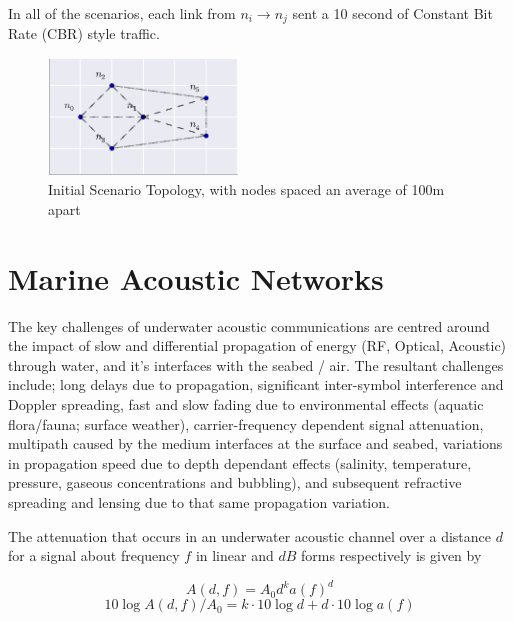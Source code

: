 \documentclass[runningheads,a4paper]{llncs}
\begin{document}
In all of the scenarios, each link from $n_i \rightarrow n_j$ sent a 10 second of Constant Bit Rate (CBR) style traffic.

\begin{figure}[h]
  \centering
  \includegraphics[width=0.45\textwidth]{img/s1_layout.pdf}
  \caption{Initial Scenario Topology, with nodes spaced an average of 100m apart}
  \label{fig:s1_layout}
\end{figure}

\section{Marine Acoustic Networks}\label{sec:marineacousticnetworks}

The key challenges of underwater acoustic communications are centred around the impact of slow and differential propagation of energy (RF, Optical, Acoustic) through water, and it's interfaces with the seabed / air.
The resultant challenges include; long delays due to propagation, significant inter-symbol interference and Doppler spreading, fast and slow fading due to environmental effects (aquatic flora/fauna; surface weather), carrier-frequency dependent signal attenuation, multipath caused by the medium interfaces at the surface and seabed, variations in propagation speed due to depth dependant effects (salinity, temperature, pressure, gaseous concentrations and bubbling), and subsequent refractive spreading and lensing due to that same propagation variation.\cite{Partan2006}

The attenuation that occurs in an underwater acoustic channel over a distance $d$ for a signal about frequency $f$ in linear and $dB$ forms respectively is given by

\begin{equation}
  \label{eq:acoattenuation}
  A(d,f) = A_0d^ka(f)^d
\end{equation}
\begin{equation}
  \label{eq:acoattenuationdb}
  10 \log A(d,f)/A_0 = k \cdot 10 \log d + d \cdot 10 \log a(f)
\end{equation}
\end{document}
